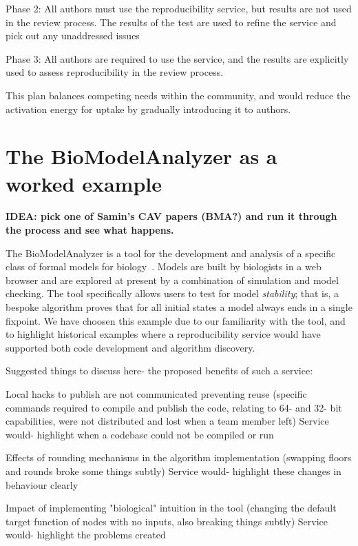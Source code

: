 \documentclass{llncs}
\begin{document}
Phase 2: All authors must use the reproducibility service, but results are not used in the review
process. The results of the test are used to refine the service and pick out any unaddressed issues

Phase 3: All authors are required to use the service, and the results are explicitly used to 
assess reproducibility in the review process.

This plan balances competing needs within the community, and would reduce the activation
energy for uptake by gradually introducing it to authors.

\section{The BioModelAnalyzer as a worked example}\label{example}

{\textbf{IDEA: pick one of Samin's CAV papers (BMA?) and run it through the process
and see what happens.}}

The BioModelAnalyzer is a tool for the development and analysis of a specific 
class of formal models for biology~\cite{benque2012,cook2010,cook2014}. Models 
are built by biologists in a web browser and are explored at present by a combination 
of simulation and model checking. The tool specifically allows users to test for 
model \emph{stability}; that is, a bespoke algorithm proves that for all initial 
states a model always ends in a single fixpoint. We have choosen this example due
to our familiarity with the tool, and to highlight historical examples where a 
reproducibility service would have supported both code development and algorithm
discovery.

Suggested things to discuss here- the proposed benefits of such a service:

Local hacks to publish are not communicated preventing reuse
(specific commands required to compile and publish the code, 
relating to 64- and 32- bit capabilities, were not distributed
and lost when a team member left)
Service would- highlight when a codebase could not be compiled or run

Effects of rounding mechanisms in the algorithm implementation
(swapping floors and rounds broke some things subtly)
Service would- highlight these changes in behaviour clearly

Impact of implementing "biological" intuition in the tool
(changing the default target function of nodes with no inputs, also
breaking things subtly)
Service would- highlight the problems created
\end{document}
